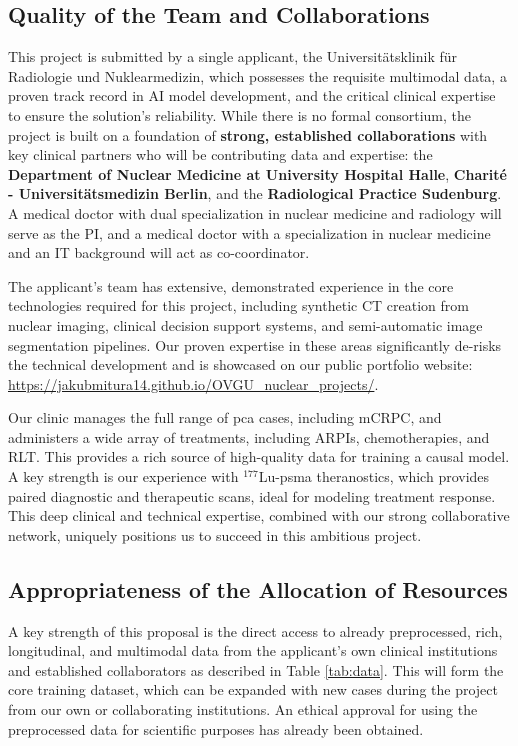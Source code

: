 \documentclass[11pt, a4paper]{article}
\begin{document}
\subsection{Quality of the Team and Collaborations}
This project is submitted by a single applicant, the Universitätsklinik für Radiologie und Nuklearmedizin, which possesses the requisite multimodal data, a proven track record in AI model development, and the critical clinical expertise to ensure the solution's reliability. While there is no formal consortium, the project is built on a foundation of \textbf{strong, established collaborations} with key clinical partners who will be contributing data and expertise: the \textbf{Department of Nuclear Medicine at University Hospital Halle}, \textbf{Charité - Universitätsmedizin Berlin}, and the \textbf{Radiological Practice Sudenburg}. A medical doctor with dual specialization in nuclear medicine and radiology will serve as the PI, and a medical doctor with a specialization in nuclear medicine and an IT background will act as co-coordinator.

The applicant's team has extensive, demonstrated experience in the core technologies required for this project, including synthetic CT creation from nuclear imaging, clinical decision support systems, and semi-automatic image segmentation pipelines. Our proven expertise in these areas significantly de-risks the technical development and is showcased on our public portfolio website: \url{https://jakubmitura14.github.io/OVGU_nuclear_projects/}.

Our clinic manages the full range of \gls{pca} cases, including mCRPC, and administers a wide array of treatments, including ARPIs, chemotherapies, and RLT. This provides a rich source of high-quality data for training a causal model. A key strength is our experience with $^{177}$Lu-\gls{psma} theranostics, which provides paired diagnostic and therapeutic scans, ideal for modeling treatment response. This deep clinical and technical expertise, combined with our strong collaborative network, uniquely positions us to succeed in this ambitious project.

\subsection{Appropriateness of the Allocation of Resources}
A key strength of this proposal is the direct access to already preprocessed, rich, longitudinal, and multimodal data from the applicant's own clinical institutions and established collaborators as described in Table \ref{tab:data}. This will form the core training dataset, which can be expanded with new cases during the project from our own or collaborating institutions. An ethical approval for using the preprocessed data for scientific purposes has already been obtained.
\end{document}
